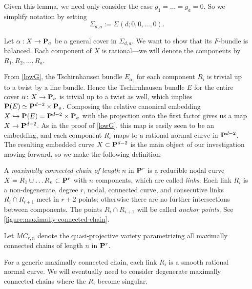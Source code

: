 \documentclass[11pt, two side, letterpaper, final]{amsart}
\renewcommand{\P}{{\bf P}}
\newcommand {\from}{\colon}
\newcommand{\MC}{MC}
\newcommand{\chain}[1]{\P_{#1}}
\begin{document}
Given this lemma, we need only consider the case $g_1=\ldots=g_a=0$. So we simplify notation by setting
\[
	\Sigma_{d,a} := \Sigma(d;0,0,\ldots,0).
\]

Let $\alpha:X \to \chain{a}$ be a general cover in $\Sigma_{d,a}$. We want to show that its $F$-bundle is balanced. Each component of $X$ is rational---we will denote the components by $R_1,R_2,\ldots, R_a$.

From \cref{lowG}, the Tschirnhausen bundle $E_{\alpha_{i}}$ for each component $R_{i}$ is trivial up to a twist by a line bundle.
Hence the Tschirnhausen bundle $E$ for the entire cover $\alpha \from X \to \chain{a}$ is trivial up to a twist as well, which implies $\P(E) \simeq \P^{d-2} \times \chain{a}$. Composing the relative canonical  embedding 
$X \hookrightarrow \P(E) = \P^{d-2} \times \chain{a}$ with the projection onto the first factor gives us a map $X \to \P^{d-2}$. As in the proof of \cref{lowG}, this
map is easily seen to be an embedding, and each component $R_i$ maps to a rational normal curve in $\P^{d-2}$.  The resulting embedded curve $X \subset \P^{d-2}$ is the main object of our investigation moving forward, so we make the following definition:

\begin{definition}
\label{definition:maximally-connected-chain}
A \emph{maximally connected chain of length} $n$ in $\P^r$ is a reducible nodal curve 
$X = R_1 \cup \ldots R_n \subset \P^r$ with $n$ components, which are called \emph{links}. Each 
link $R_i$ is a non-degenerate, degree $r$, nodal, connected curve, and consecutive links $R_i \cap R_{i+1}$ meet in $r+2$ points; otherwise there are no further intersections between components.  The points $R_{i} \cap R_{i+1}$ will be called \emph{anchor points}. See \cref{figure:maximally-connected-chain}.

Let $\MC_{r,n}$ denote the quasi-projective variety parametrizing all maximally connected chains of length $n$ in $\P^r$.
\end{definition}
\begin{remark}
For a generic maximally connected chain, each link $R_i$ is a smooth rational normal curve. We will eventually need to consider degenerate maximally connected chains where the $R_{i}$ become singular.
\end{remark}
\end{document}

